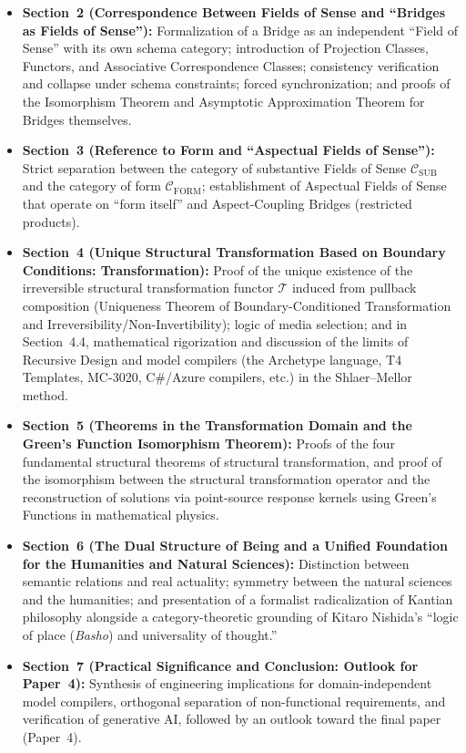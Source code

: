 \documentclass[11pt,a4paper]{article}
\theoremstyle{definition}
\theoremstyle{plain}
\theoremstyle{remark}
\newcommand{\CFORM}{\mathcal{C}_{\mathrm{FORM}}}
\newcommand{\CSUB}{\mathcal{C}_{\mathrm{SUB}}}
\begin{document}
\begin{itemize}
    \item \textbf{Section~2 (Correspondence Between Fields of Sense and ``Bridges as Fields of Sense''):} Formalization of a Bridge as an independent ``Field of Sense'' with its own schema category; introduction of Projection Classes, Functors, and Associative Correspondence Classes; consistency verification and collapse under schema constraints; forced synchronization; and proofs of the Isomorphism Theorem and Asymptotic Approximation Theorem for Bridges themselves.
    \item \textbf{Section~3 (Reference to Form and ``Aspectual Fields of Sense''):} Strict separation between the category of substantive Fields of Sense $\CSUB$ and the category of form $\CFORM$; establishment of Aspectual Fields of Sense that operate on ``form itself'' and Aspect-Coupling Bridges (restricted products).
    \item \textbf{Section~4 (Unique Structural Transformation Based on Boundary Conditions: Transformation):} Proof of the unique existence of the irreversible structural transformation functor $\mathcal{T}$ induced from pullback composition (Uniqueness Theorem of Boundary-Conditioned Transformation and Irreversibility/Non-Invertibility); logic of media selection; and in Section~4.4, mathematical rigorization and discussion of the limits of Recursive Design and model compilers (the Archetype language, T4 Templates, MC-3020, C\#/Azure compilers, etc.) in the Shlaer--Mellor method.
    \item \textbf{Section~5 (Theorems in the Transformation Domain and the Green's Function Isomorphism Theorem):} Proofs of the four fundamental structural theorems of structural transformation, and proof of the isomorphism between the structural transformation operator and the reconstruction of solutions via point-source response kernels using Green's Functions in mathematical physics.
    \item \textbf{Section~6 (The Dual Structure of Being and a Unified Foundation for the Humanities and Natural Sciences):} Distinction between semantic relations and real actuality; symmetry between the natural sciences and the humanities; and presentation of a formalist radicalization of Kantian philosophy alongside a category-theoretic grounding of Kitaro Nishida's ``logic of place (\emph{Basho}) and universality of thought.''
    \item \textbf{Section~7 (Practical Significance and Conclusion: Outlook for Paper~4):} Synthesis of engineering implications for domain-independent model compilers, orthogonal separation of non-functional requirements, and verification of generative AI, followed by an outlook toward the final paper (Paper~4).
\end{itemize}
\end{document}
